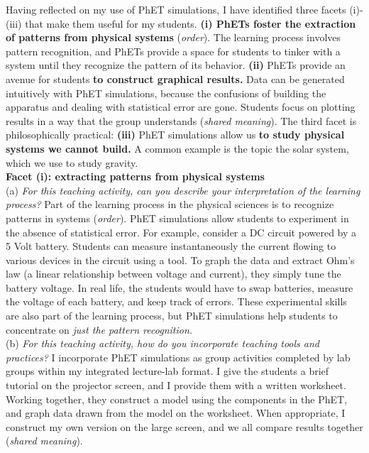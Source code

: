 \documentclass[../../../main.tex]{subfiles}
\begin{document}
Having reflected on my use of PhET simulations, I have identified three facets (i)-(iii) that make them useful for my students. \textbf{(i) PhETs foster the extraction of patterns from physical systems} (\textit{order}).  The learning process involves pattern recognition, and PhETs provide a space for students to tinker with a system until they recognize the pattern of its behavior. \textbf{(ii)} PhETs provide an avenue for students \textbf{to construct graphical results.} Data can be generated intuitively with PhET simulations, because the confusions of building the apparatus and dealing with statistical error are gone.  Students focus on plotting results in a way that the group understands (\textit{shared meaning}).  The third facet is philosophically practical: \textbf{(iii)} PhET simulations allow us \textbf{to study physical systems we cannot build.}  A common example is the topic the solar system, which we use to study gravity.
\\
\vspace{0.25cm}
\textbf{Facet (i): extracting patterns from physical systems}
\\
\vspace{0.25cm}
(a) \textit{For this teaching activity, can you describe your interpretation of the learning process?} Part of the learning process in the physical sciences is to recognize patterns in systems (\textit{order}).  PhET simulations allow students to experiment in the absence of statistical error.  For example, consider a DC circuit powered by a 5 Volt battery.  Students can measure instantaneously the current flowing to various devices in the circuit using a tool.  To graph the data and extract Ohm's law (a linear relationship between voltage and current), they simply tune the battery voltage.  In real life, the students would have to swap batteries, measure the voltage of each battery, and keep track of errors.  These experimental skills are also part of the learning process, but PhET simulations help students to concentrate on \textit{just the pattern recognition.}
\\
\vspace{0.25cm}
(b) \textit{For this teaching activity, how do you incorporate teaching tools and practices?}  I incorporate PhET simulations as group activities completed by lab groups within my integrated lecture-lab format.  I give the students a brief tutorial on the projector screen, and I provide them with a written worksheet.  Working together, they construct a model using the components in the PhET, and graph data drawn from the model on the worksheet.  When appropriate, I construct my own version on the large screen, and we all compare results together (\textit{shared meaning}).
\end{document}
